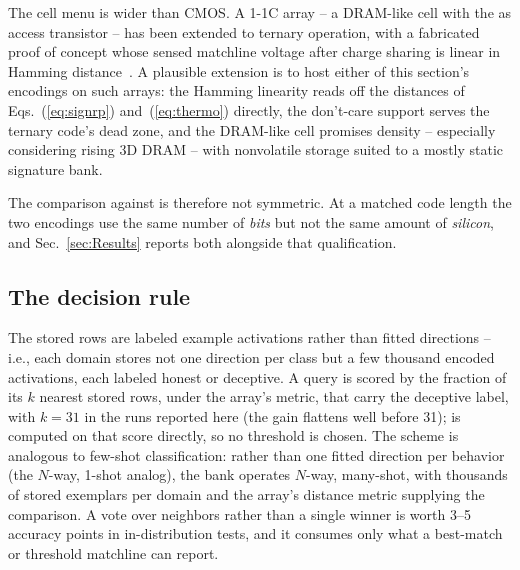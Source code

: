 The cell menu is wider than CMOS. A 1\fefet-1C array -- a DRAM-like
cell with the \fefet as access transistor -- has been extended to
ternary \cam operation, with a fabricated proof of concept whose
sensed matchline voltage after charge sharing is linear in Hamming
distance~\cite{fefet1c2026}. A plausible extension is to host either
of this section's encodings on such arrays: the Hamming linearity
reads off the distances of Eqs.~(\ref{eq:signrp})
and~(\ref{eq:thermo}) directly, the don't-care support serves the
ternary code's dead zone, and the DRAM-like cell promises density --
especially considering rising 3D DRAM -- with nonvolatile storage
suited to a mostly static signature bank.

The comparison against \signrp is therefore not symmetric. At a matched
code length the two encodings use the same number of \emph{bits} but not
the same amount of \emph{silicon}, and Sec.~\ref{sec:Results} reports
both alongside that qualification.

\subsection{The decision rule}

\label{subsec:Decision}
The stored rows are labeled example activations rather than fitted
directions -- i.e., each domain stores not one direction per class
but a few thousand encoded activations, each labeled honest or
deceptive. A query is scored by the fraction of its $k$ nearest stored
rows, under the array's metric, that carry the deceptive label, with
$k=31$ in the runs reported here (the gain flattens well before 31);
\auroc is computed on that score directly, so no threshold is
chosen. The scheme is analogous to few-shot classification:
rather than one fitted direction per behavior (the $N$-way, 1-shot
analog), the bank operates $N$-way, many-shot, with thousands of
stored exemplars per domain and the array's distance metric supplying
the comparison. A vote over neighbors rather than a single winner is
worth 3--5 accuracy points in in-distribution tests, and it consumes
only what a best-match or threshold matchline can report.

